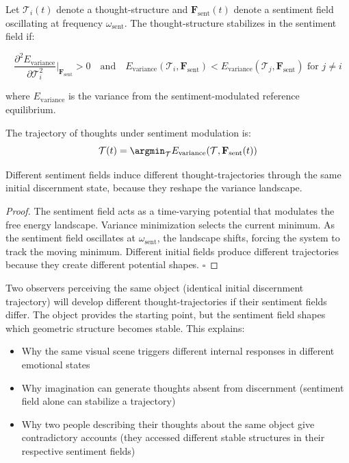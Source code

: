 \begin{theorem}
\label{thm:thought-stability}
Let $\mathcal{T}_i(t)$ denote a thought-structure and $\mathbf{F}_{\text{sent}}(t)$ denote a sentiment field oscillating at frequency $\omega_{\text{sent}}$. The thought-structure stabilizes in the sentiment field if:

\begin{equation}
\frac{\partial^2 E_{\text{variance}}}{\partial \mathcal{T}_i^2}\bigg|_{\mathbf{F}_{\text{sent}}} > 0 \quad \text{and} \quad E_{\text{variance}}(\mathcal{T}_i, \mathbf{F}_{\text{sent}}) < E_{\text{variance}}(\mathcal{T}_j, \mathbf{F}_{\text{sent}}) \text{ for } j \neq i
\end{equation}

where $E_{\text{variance}}$ is the variance from the sentiment-modulated reference equilibrium.

The trajectory of thoughts under sentiment modulation is:
$$\mathcal{T}(t) = \argmin_{\mathcal{T}} E_{\text{variance}}(\mathcal{T}, \mathbf{F}_{\text{sent}}(t))$$

Different sentiment fields induce different thought-trajectories through the same initial discernment state, because they reshape the variance landscape.
\end{theorem}

\begin{proof}
The sentiment field acts as a time-varying potential that modulates the free energy landscape. Variance minimization selects the current minimum. As the sentiment field oscillates at $\omega_{\text{sent}}$, the landscape shifts, forcing the system to track the moving minimum. Different initial fields produce different trajectories because they create different potential shapes. $\square$
\end{proof}

\begin{remark}
Two observers perceiving the same object (identical initial discernment trajectory) will develop different thought-trajectories if their sentiment fields differ. The object provides the starting point, but the sentiment field shapes which geometric structure becomes stable. This explains:

\begin{itemize}
\item Why the same visual scene triggers different internal responses in different emotional states
\item Why imagination can generate thoughts absent from discernment (sentiment field alone can stabilize a trajectory)
\item Why two people describing their thoughts about the same object give contradictory accounts (they accessed different stable structures in their respective sentiment fields)
\end{itemize}
\end{remark}

